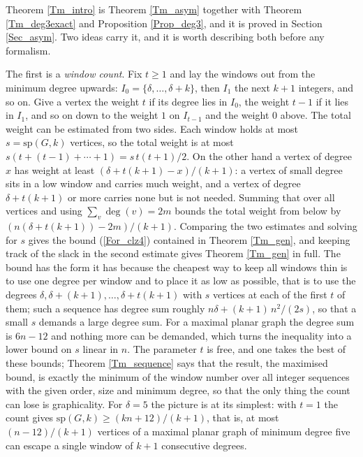 \documentclass[12pt,a4paper]{article}%
\begin{document}
Theorem \ref{Tm_intro} is Theorem \ref{Tm_asym} together with Theorem \ref{Tm_deg3exact} and
Proposition \ref{Prop_deg3}, and it is proved in Section \ref{Sec_asym}. Two ideas carry it, and it is
worth describing both before any formalism.

The first is a \emph{window count}. Fix $t\geq 1$ and lay the windows out from the minimum degree
upwards: $I_{0}=\{\delta ,\ldots ,\delta +k\}$, then $I_{1}$ the next $k+1$ integers, and so on. Give a
vertex the weight $t$ if its degree lies in $I_{0}$, the weight $t-1$ if it lies in $I_{1}$, and so on
down to the weight $1$ on $I_{t-1}$ and the weight $0$ above. The total weight can be estimated from two
sides. Each window holds at most $s=\mathrm{sp}(G,k)$ vertices, so the total weight is at most
$s\left( t+(t-1)+\cdots +1\right) =s\,t(t+1)/2$. On the other hand a vertex of degree $x$ has weight at
least $\left( \delta +t(k+1)-x\right) /(k+1)$: a vertex of small degree sits in a low window and carries
much weight, and a vertex of degree $\delta +t(k+1)$ or more carries none but is not needed. Summing that
over all vertices and using $\sum_{v}\deg (v)=2m$ bounds the total weight from below by
$\left( n(\delta +t(k+1))-2m\right) /(k+1)$. Comparing the two estimates and solving for $s$ gives the
bound (\ref{For_clz4}) contained in Theorem \ref{Tm_gen}, and keeping track of the slack in the second
estimate gives Theorem \ref{Tm_gen} in full. The bound has the form it has because the cheapest way to keep all windows thin is to use
one degree per window and to place it as low as possible, that is to use the degrees $\delta ,\delta
+(k+1),\ldots ,\delta +t(k+1)$ with $s$ vertices at each of the first $t$ of them; such a sequence has
degree sum roughly $n\delta +(k+1)\,n^{2}/(2s)$, so that a small $s$ demands a large degree sum. For a
maximal planar graph the degree sum is $6n-12$ and nothing more can be demanded, which turns the inequality
into a lower bound on $s$ linear in $n$. The parameter $t$ is free, and one takes the best of these
bounds; Theorem \ref{Tm_sequence} says that the result, the maximised bound, is exactly the minimum of
the window number over all integer sequences with the given order, size and minimum degree, so that the
only thing the count can lose is graphicality. For $\delta =5$ the picture is at its simplest: with
$t=1$ the count gives $\mathrm{sp}(G,k)\geq (kn+12)/(k+1)$, that is, at most $(n-12)/(k+1)$ vertices of
a maximal planar graph of minimum degree five can escape a single window of $k+1$ consecutive degrees.
\end{document}
